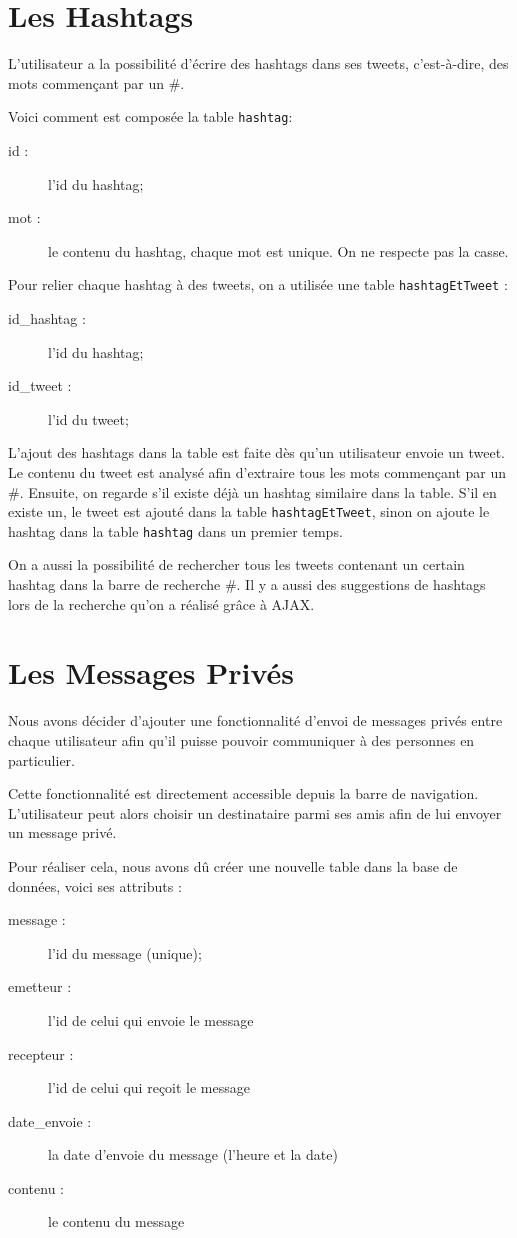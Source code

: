 \documentclass[a4paper, 12pt]{article}
\begin{document}
\newpage
\section{Les Hashtags}		
L'utilisateur a la possibilité d'écrire des hashtags dans ses tweets, c'est-à-dire, des mots commençant par un \#. 

Voici comment est composée la table \texttt{hashtag}:
\begin{description}
\item[id :] l'id du hashtag;
\item[mot :] le contenu du hashtag, chaque mot est unique. On ne respecte pas la casse.
\end{description}
Pour relier chaque hashtag à des tweets, on a utilisée une table \texttt{hashtagEtTweet} : 
\begin{description}
\item[id\_hashtag :] l'id du hashtag;
\item[id\_tweet :] l'id du tweet;
\end{description}

L'ajout des hashtags dans la table est faite dès qu'un utilisateur envoie un tweet. Le contenu du tweet est analysé afin d'extraire tous les mots commençant par un \#. Ensuite, on regarde s'il existe déjà un hashtag similaire dans la table. S'il en existe un, le tweet est ajouté dans la table \texttt{hashtagEtTweet}, sinon on ajoute le hashtag dans la table \texttt{hashtag} dans un premier temps.
\vspace{1\baselineskip}

On a aussi la possibilité de rechercher tous les tweets contenant un certain hashtag dans la barre de recherche \#. Il y a aussi des suggestions de hashtags lors de la recherche qu'on a réalisé grâce à AJAX.

\section{Les Messages Privés}	
Nous avons décider d'ajouter une fonctionnalité d'envoi de messages privés entre chaque utilisateur afin qu'il puisse pouvoir communiquer à des personnes en particulier. 

Cette fonctionnalité est directement accessible depuis la barre de navigation. L'utilisateur peut alors choisir un destinataire parmi ses amis afin de lui envoyer un message privé.

Pour réaliser cela, nous avons dû créer une nouvelle table dans la base de données, voici ses attributs :
\begin{description}
\item[message :] l'id du message (unique);
\item[emetteur :] l'id de celui qui envoie le message
\item[recepteur :] l'id de celui qui reçoit le message
\item[date\_envoie :] la date d'envoie du message (l'heure et la date)
\item[contenu :] le contenu du message
\end{description}
	
\end{document}
